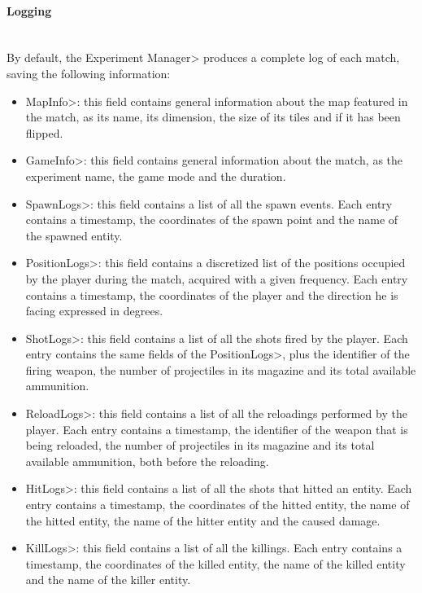 \paragraph{Logging}

\mbox{}\\

{\setlength{\parindent}{0cm}
By default, the \<Experiment Manager> produces a complete log of each match, saving the following information:}

\begin{itemize}
\item \<MapInfo>: this field contains general information about the map featured in the match, as its name, its dimension, the size of its tiles and if it has been flipped.
\item \<GameInfo>: this field contains general information about the match, as the experiment name, the game mode and the duration.
\item \<SpawnLogs>: this field contains a list of all the spawn events. Each entry contains a timestamp, the coordinates of the spawn point and the name of the spawned entity.
\item \<PositionLogs>: this field contains a discretized list of the positions occupied by the player during the match, acquired with a given frequency. Each entry contains a timestamp, the coordinates of the player and the direction he is facing expressed in degrees.
\item \<ShotLogs>: this field contains a list of all the shots fired by the player. Each entry contains the same fields of the \<PositionLogs>, plus the identifier of the firing weapon, the number of projectiles in its magazine and its total available ammunition.
\item \<ReloadLogs>: this field contains a list of all the reloadings performed by the player. Each entry contains a timestamp, the identifier of the weapon that is being reloaded, the number of projectiles in its magazine and its total available ammunition, both before the reloading.
\item \<HitLogs>: this field contains a list of all the shots that hitted an entity. Each entry contains a timestamp, the coordinates of the hitted entity, the name of the hitted entity, the name of the hitter entity and the caused damage.
\item \<KillLogs>: this field contains a list of all the killings. Each entry contains a timestamp, the coordinates of the killed entity, the name of the killed entity and the name of the killer entity.
\end{itemize}

